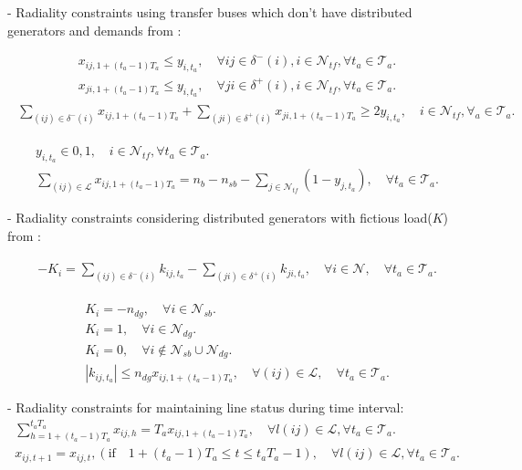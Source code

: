 \documentclass{article}
\begin{document}
- Radiality constraints using transfer buses which don't have distributed generators and demands from \cite{5982115}:
{\allowdisplaybreaks
\begin{align}
  x_{ij,1+(t_{a}-1)T_{a}} \leq y_{i,t_{a}}, \quad \forall ij \in \delta^{-}(i), i \in \mathcal{N}_{tf}, \forall t_{a} \in \mathcal{T}_{a}.\\
  x_{ji,1+(t_{a}-1)T_{a}} \leq y_{i,t_{a}}, \quad \forall ji \in \delta^{+}(i), i \in \mathcal{N}_{tf}, \forall t_{a} \in \mathcal{T}_{a}.
\end{align}
\begin{align}
  \begin{split}
    \sum_{(ij) \in \delta^{-}(i)}x_{ij,1+(t_{a}-1)T_{a}} + \sum_{(ji) \in \delta^{+}(i)}x_{ji,1+(t_{a}-1)T_{a}} \geq 2y_{i,t_{a}}, 
    \quad i \in \mathcal{N}_{tf}, \forall _{a} \in \mathcal{T}_{a}.
  \end{split}
\end{align}

\begin{align}
  y_{i,t_{a}} \in {0,1}, \quad i \in \mathcal{N}_{tf}, \forall t_{a} \in \mathcal{T}_{a}.\\
  \sum_{(ij) \in \mathcal{L}}x_{ij,1+(t_{a}-1)T_{a}} = n_{b} - n_{sb} - \sum_{j \in \mathcal{N}_{tf}} (1-y_{j,t_{a}}), \quad \forall t_{a} \in \mathcal{T}_{a}.
\end{align}
}

- Radiality constraints considering distributed generators with fictious load($K$) from \cite{5982115}:
{\allowdisplaybreaks
\begin{align}
  \begin{split}
    -K_{i} = \sum_{(ij) \in \delta^{-}(i)} k_{ij,t_{a}} - \sum_{(ji) \in \delta^{+}(i)} k_{ji,t_{a}}, 
    \quad \forall i \in \mathcal{N}, \quad \forall t_{a} \in \mathcal{T}_{a}.
  \end{split}
\end{align}

\begin{align}
    K_{i} = -n_{dg}, \quad \forall i \in \mathcal{N}_{sb}. \\
    K_{i} = 1, \quad \forall i \in \mathcal{N}_{dg}. \\
    K_{i} = 0, \quad \forall i \notin \mathcal{N}_{sb} \cup \mathcal{N}_{dg}. \\
    |k_{ij,t_{a}}| \leq n_{dg} x_{ij,1+(t_{a}-1)T_{a}}, \quad \forall (ij) \in \mathcal{L}, \quad \forall t_{a} \in \mathcal{T}_{a}. 
\end{align}
}

- Radiality constraints for maintaining line status during time interval:
{\allowdisplaybreaks
\begin{align}
  \sum_{h=1+(t_{a}-1)T_{a}}^{t_{a}T_{a}}x_{ij,h} = T_{a}x_{ij,1+(t_{a}-1)T_{a}}, \quad \forall l(ij) \in \mathcal{L}, \forall t_{a} \in \mathcal{T}_{a}.\\
  x_{ij,t+1} = x_{ij,t}, ( \text{if} \quad 1+(t_{a}-1)T_{a} \leq t \leq t_{a}T_{a}-1) , \quad \forall l(ij) \in \mathcal{L}, \forall t_{a} \in \mathcal{T}_{a}.
\end{align}
}



 

\end{document}
